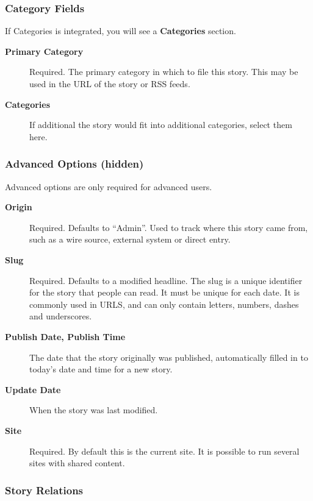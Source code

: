 \documentclass[letterpaper,10pt,english]{manual}
\begin{document}
\subsubsection{Category Fields}

If Categories is integrated, you will see a \textbf{Categories} section.
\begin{description}
\item[\textbf{Primary Category}] \leavevmode
Required. The primary category in which to file this story. This may be used in the URL of the story or RSS feeds.

\item[\textbf{Categories}] \leavevmode
If additional the story would fit into additional categories, select them here.

\end{description}


\subsubsection{Advanced Options (hidden)}

Advanced options are only required for advanced users.
\begin{description}
\item[\textbf{Origin}] \leavevmode
Required. Defaults to ``Admin''. Used to track where this story came from, such as a wire source, external system or direct entry.

\item[\textbf{Slug}] \leavevmode
Required. Defaults to a modified headline. The slug is a unique identifier for the story that people can read. It must be unique for each date. It is commonly used in URLS, and can only contain letters, numbers, dashes and underscores.

\item[\textbf{Publish Date, Publish Time}] \leavevmode
The date that the story originally was published, automatically filled in to today's date and time for a new story.

\item[\textbf{Update Date}] \leavevmode
When the story was last modified.

\item[\textbf{Site}] \leavevmode
Required. By default this is the current site. It is possible to run several sites with shared content.

\end{description}


\subsubsection{Story Relations}
\end{document}
